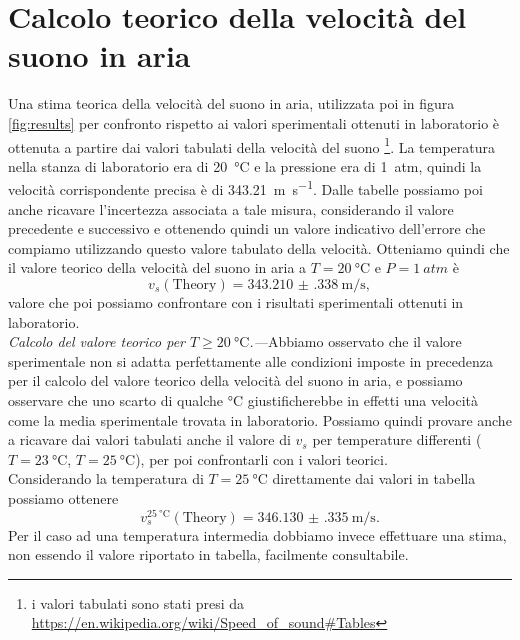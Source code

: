 \documentclass[
    prl,
    reprint, 
    superscriptaddress, 
    altaffilletter, 
    amsmath, 
    amssymb, 
    a4paper,
    varvw]{revtex4-2}
\begin{document}
\appendix

\section{Calcolo teorico della velocità del suono in aria}\label{sec:appendix_A}
Una stima teorica della velocità del suono in aria, utilizzata poi in figura \ref{fig:results} per confronto rispetto ai valori sperimentali ottenuti in laboratorio è ottenuta a partire dai valori tabulati della velocità del suono \footnote{i valori tabulati sono stati presi da \url{https://en.wikipedia.org/wiki/Speed_of_sound\#Tables}}. La temperatura nella stanza di laboratorio era di \SI{20}{\celsius} e la pressione era di \SI{1}{atm}, quindi la velocità corrispondente precisa è di \SI{343.21}{\metre\per\second}. Dalle tabelle possiamo poi anche ricavare l'incertezza associata a tale misura, considerando il valore precedente e successivo e ottenendo quindi un valore indicativo dell'errore che compiamo utilizzando questo valore tabulato della velocità. Otteniamo quindi che il valore teorico della velocità del suono in aria a $T=\SI{20}{\celsius}$ e $P=\SI{1}{atm}$ è \[v_s(\text{Theory}) = \SI{343.210(338)}{\metre\per\second},\] valore che poi possiamo confrontare con i risultati sperimentali ottenuti in laboratorio. \\
\textit{Calcolo del valore teorico per $T \geq \SI{20}{\celsius}$.---}Abbiamo osservato che il valore sperimentale non si adatta perfettamente alle condizioni imposte in precedenza per il calcolo del valore teorico della velocità del suono in aria, e possiamo osservare che uno scarto di qualche \si[]{\celsius} giustificherebbe in effetti una velocità come la media sperimentale trovata in laboratorio. Possiamo quindi provare anche a ricavare dai valori tabulati anche il valore di $v_s$ per temperature differenti ($T=\SI{23}{\celsius}$, $T=\SI{25}{\celsius}$), per poi confrontarli con i valori teorici. \\
Considerando la temperatura di $T=\SI{25}{\celsius}$ direttamente dai valori in tabella possiamo ottenere \[v_s^{\SI{25}{\celsius}}(\text{Theory})=\SI{346.130(335)}{\metre\per\second}.\] 
Per il caso ad una temperatura intermedia dobbiamo invece effettuare una stima, non essendo il valore riportato in tabella, facilmente consultabile. 
\end{document}
